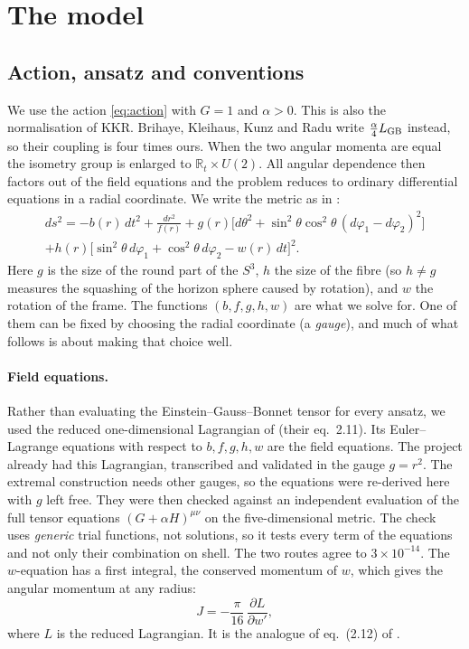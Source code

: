 \documentclass[11pt,a4paper]{article}
\begin{document}
\section{The model}
\label{sec:model}

\subsection{Action, ansatz and conventions}

We use the action \eqref{eq:action} with $G=1$ and $\alpha>0$. This is also the
normalisation of KKR. Brihaye, Kleihaus, Kunz and Radu \cite{BKKR2010} write
$\tfrac{\alpha}{4}L_{\rm GB}$ instead, so their coupling is four times ours.
When the two angular momenta are equal the isometry group is enlarged to
$\mathbb R_t\times U(2)$. All angular dependence then factors out of the field
equations and the problem reduces to ordinary differential equations in a radial
coordinate. We write the metric as in \cite{BKKR2010}:
\begin{multline}
  ds^2=-b(r)\,dt^2+\frac{dr^2}{f(r)}
  +g(r)\bigl[d\theta^2+\sin^2\theta\cos^2\theta\,(d\varphi_1-d\varphi_2)^2\bigr]\\
  +h(r)\bigl[\sin^2\theta\,d\varphi_1+\cos^2\theta\,d\varphi_2-w(r)\,dt\bigr]^2 .
  \label{eq:metric}
\end{multline}
Here $g$ is the size of the round part of the $S^3$, $h$ the size of the fibre
(so $h\ne g$ measures the squashing of the horizon sphere caused by rotation), and
$w$ the rotation of the frame. The functions $(b,f,g,h,w)$ are what we solve
for. One of them can be fixed by choosing the radial coordinate (a
\emph{gauge}), and much of what follows is about making that choice well.

\paragraph{Field equations.} Rather than evaluating the Einstein--Gauss--Bonnet
tensor for every ansatz, we used the reduced one-dimensional Lagrangian of
\cite{BKKR2010} (their eq.~2.11). Its Euler--Lagrange equations with respect to
$b,f,g,h,w$ are the field equations. The project already had this Lagrangian,
transcribed and validated in the gauge $g=r^2$. The extremal construction needs
other gauges, so the equations were re-derived here with $g$ left free. They were
then checked against an independent evaluation of the full tensor equations
$(G+\alpha H)^{\mu\nu}$ on the five-dimensional metric. The check uses
\emph{generic} trial functions, not solutions, so it tests every term of the
equations and not only their combination on shell. The two routes agree to
$3\times10^{-14}$. The $w$-equation has a first integral, the conserved momentum
of $w$, which gives the angular momentum at any radius:
\begin{equation}
  J=-\frac{\pi}{16}\,\frac{\partial L}{\partial w'} ,
  \label{eq:J}
\end{equation}
where $L$ is the reduced Lagrangian. It is the analogue of eq.~(2.12) of
\cite{BKKR2010}.
\end{document}
